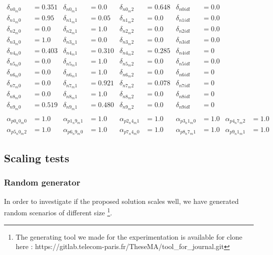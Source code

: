 \begin{align}
\delta_{n0_m0} &= 0.351 & \delta_{n0_m1} &= 0.0 & \delta_{n0_m2} &= 0.648  & \delta_{n0idl} &= 0.0 \nonumber \\
\delta_{n1_m0} &= 0.95 & \delta_{n1_m1} &= 0.05 & \delta_{n1_m2} &= 0.0 & \delta_{n1idl} &= 0.0 \nonumber  \\
\delta_{n2_m0} &= 0.0 & \delta_{n2_m1} &= 1.0 & \delta_{n2_m2} &= 0.0 & \delta_{n2idl} &= 0.0 \nonumber  \\
\delta_{n3_m0} &= 1.0  & \delta_{n3_m1} &= 0.0 & \delta_{n3_m2} &= 0.0 & \delta_{n3idl} &= 0.0 \nonumber  \\
\delta_{n4_m0} &= 0.403 & \delta_{n4_m1} &= 0.310 & \delta_{n4_m2} &= 0.285 & \delta_{n4idl} &= 0   \nonumber  \\
\delta_{n5_m0} &= 0.0 & \delta_{n5_m1} &= 1.0 &\delta_{n5_m2} &= 0.0 & \delta_{n5idl} &= 0.0  \nonumber  \\
\delta_{n6_m0} &= 0.0 & \delta_{n6_m1} &= 1.0 & \delta_{n6_m2} &= 0.0 & \delta_{n6idl} &= 0 \nonumber  \\
\delta_{n7_m0} &= 0.0 & \delta_{n7_m1} &= 0.921 & \delta_{n7_m2} &= 0.078 & \delta_{n7idl} &= 0  \nonumber  \\
\delta_{n8_m0} &= 0.0 & \delta_{n8_m1} &= 1.0 & \delta_{n8_m2} &= 0.0 & \delta_{n8idl} &= 0 \nonumber  \\
\delta_{n9_m0} &= 0.519 & \delta_{n9_m1} &= 0.480 & \delta_{n9_m2} &= 0.0 & \delta_{n9idl} &= 0 \label{def_strat} \\ \nonumber \\
\alpha_{p0_n0_m0} &= 1.0 & \alpha_{p1_n9_m1} &= 1.0 & \alpha_{p2_n4_m1} &= 1.0 & \alpha_{p3_n1_m0} &= 1.0 & \alpha_{p4_n7_m2} &= 1.0 \nonumber \\
\alpha_{p5_n0_m2} &= 1.0 & \alpha_{p6_n9_m0} &= 1.0 & \alpha_{p7_n4_m0} &= 1.0 & \alpha_{p8_n7_m1} &= 1.0 & \alpha_{p9_n1_m1} &= 1.0  \label{att_strat}
\end{align}


\subsection{Scaling tests}

\subsubsection{Random generator}

In order to investigate if the proposed solution scales well, we have generated random scenarios of different size \footnote{The generating tool we made for the experimentation is available for clone here : https://gitlab.telecom-paris.fr/TheseMA/tool\_for\_journal.git}.

